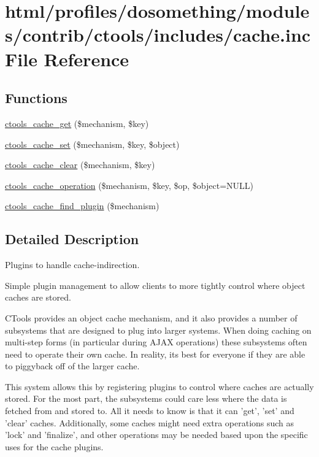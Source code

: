 \hypertarget{ctools_2includes_2cache_8inc}{
\section{html/profiles/dosomething/modules/contrib/ctools/includes/cache.inc File Reference}
\label{ctools_2includes_2cache_8inc}
}
\subsection*{Functions}
\begin{DoxyCompactItemize}
\item 
\hyperlink{ctools_2includes_2cache_8inc_aecf3d4869c6b8eabd5d9be3dfd6d08b2}{ctools\_\-cache\_\-get} (\$mechanism, \$key)
\item 
\hyperlink{ctools_2includes_2cache_8inc_a631e9d4813f723aa49a49aa85f8c4c8c}{ctools\_\-cache\_\-set} (\$mechanism, \$key, \$object)
\item 
\hyperlink{ctools_2includes_2cache_8inc_a101263b0d8cf633a221db17bff52e47b}{ctools\_\-cache\_\-clear} (\$mechanism, \$key)
\item 
\hyperlink{ctools_2includes_2cache_8inc_aaa68caf3223df01f8a019a10a7f5cbd9}{ctools\_\-cache\_\-operation} (\$mechanism, \$key, \$op, \$object=NULL)
\item 
\hyperlink{ctools_2includes_2cache_8inc_ae2a3a4be93449ac5ed9c98c3b40f9004}{ctools\_\-cache\_\-find\_\-plugin} (\$mechanism)
\end{DoxyCompactItemize}


\subsection{Detailed Description}
Plugins to handle cache-\/indirection.

Simple plugin management to allow clients to more tightly control where object caches are stored.

CTools provides an object cache mechanism, and it also provides a number of subsystems that are designed to plug into larger systems. When doing caching on multi-\/step forms (in particular during AJAX operations) these subsystems often need to operate their own cache. In reality, its best for everyone if they are able to piggyback off of the larger cache.

This system allows this by registering plugins to control where caches are actually stored. For the most part, the subsystems could care less where the data is fetched from and stored to. All it needs to know is that it can 'get', 'set' and 'clear' caches. Additionally, some caches might need extra operations such as 'lock' and 'finalize', and other operations may be needed based upon the specific uses for the cache plugins.

